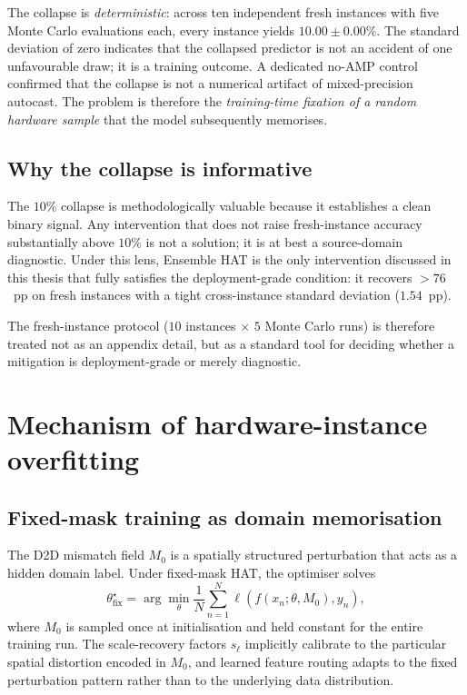 The collapse is \emph{deterministic}: across ten independent fresh instances with five Monte Carlo evaluations each, every instance yields $10.00\pm0.00\%$.  The standard deviation of zero indicates that the collapsed predictor is not an accident of one unfavourable draw; it is a training outcome.  A dedicated no-AMP control confirmed that the collapse is not a numerical artifact of mixed-precision autocast.  The problem is therefore the \emph{training-time fixation of a random hardware sample} that the model subsequently memorises.

\subsection{Why the collapse is informative}

The $10\%$ collapse is methodologically valuable because it establishes a clean binary signal.  Any intervention that does not raise fresh-instance accuracy substantially above $10\%$ is not a solution; it is at best a source-domain diagnostic.  Under this lens, Ensemble HAT is the only intervention discussed in this thesis that fully satisfies the deployment-grade condition: it recovers $>76$~pp on fresh instances with a tight cross-instance standard deviation ($1.54$~pp).

The fresh-instance protocol ($10$ instances $\times$ $5$ Monte Carlo runs) is therefore treated not as an appendix detail, but as a standard tool for deciding whether a mitigation is deployment-grade or merely diagnostic.


\section{Mechanism of hardware-instance overfitting}
\label{sec:ch1-mechanism}

\subsection{Fixed-mask training as domain memorisation}

The D2D mismatch field $M_{0}$ is a spatially structured perturbation that acts as a hidden domain label.  Under fixed-mask HAT, the optimiser solves
\begin{equation}
    \theta_{\mathrm{fix}}^{\star} = \arg\min_{\theta} \frac{1}{N} \sum_{n=1}^{N} \ell\!\left(f(x_{n}; \theta, M_{0}), y_{n}\right),
    \label{eq:fixed-mask-ch1}
\end{equation}
where $M_{0}$ is sampled once at initialisation and held constant for the entire training run.  The scale-recovery factors $s_{\ell}$ implicitly calibrate to the particular spatial distortion encoded in $M_{0}$, and learned feature routing adapts to the fixed perturbation pattern rather than to the underlying data distribution.

